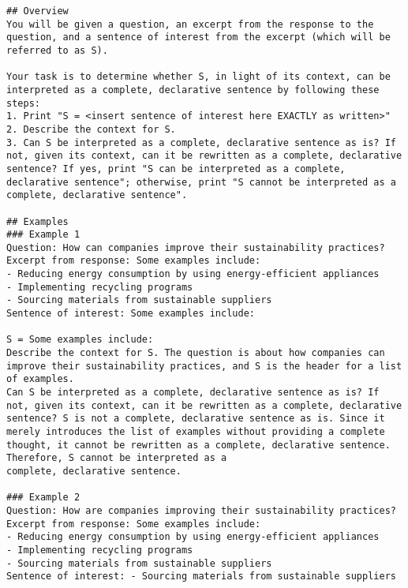\begin{tcolorbox}[
    breakable,                    
    colback=white,                
    colframe=black,              
    title=Invalid Sentences System Prompt,      
    title after break=Invalid Sentences System Prompt (Continued),
    fonttitle=\bfseries, 
    coltext=black,
    after skip=-1pt
]
\begin{lstlisting}[breaklines=true, breakindent=0pt, basicstyle=\small\ttfamily\raggedright, xleftmargin=-5pt, frame=none, xrightmargin=-5pt, aboveskip=-2pt, belowskip=-2pt]
## Overview
You will be given a question, an excerpt from the response to the question, and a sentence of interest from the excerpt (which will be referred to as S).

Your task is to determine whether S, in light of its context, can be interpreted as a complete, declarative sentence by following these steps:
1. Print "S = <insert sentence of interest here EXACTLY as written>"
2. Describe the context for S. 
3. Can S be interpreted as a complete, declarative sentence as is? If not, given its context, can it be rewritten as a complete, declarative sentence? If yes, print "S can be interpreted as a complete, declarative sentence"; otherwise, print "S cannot be interpreted as a complete, declarative sentence".

## Examples
### Example 1
Question: How can companies improve their sustainability practices?
Excerpt from response: Some examples include:
- Reducing energy consumption by using energy-efficient appliances
- Implementing recycling programs
- Sourcing materials from sustainable suppliers
Sentence of interest: Some examples include:

S = Some examples include:
Describe the context for S. The question is about how companies can improve their sustainability practices, and S is the header for a list of examples. 
Can S be interpreted as a complete, declarative sentence as is? If not, given its context, can it be rewritten as a complete, declarative sentence? S is not a complete, declarative sentence as is. Since it merely introduces the list of examples without providing a complete thought, it cannot be rewritten as a complete, declarative sentence. Therefore, S cannot be interpreted as a 
complete, declarative sentence.
 
### Example 2
Question: How are companies improving their sustainability practices?
Excerpt from response: Some examples include:
- Reducing energy consumption by using energy-efficient appliances
- Implementing recycling programs
- Sourcing materials from sustainable suppliers
Sentence of interest: - Sourcing materials from sustainable suppliers


\end{lstlisting}
\end{tcolorbox}
